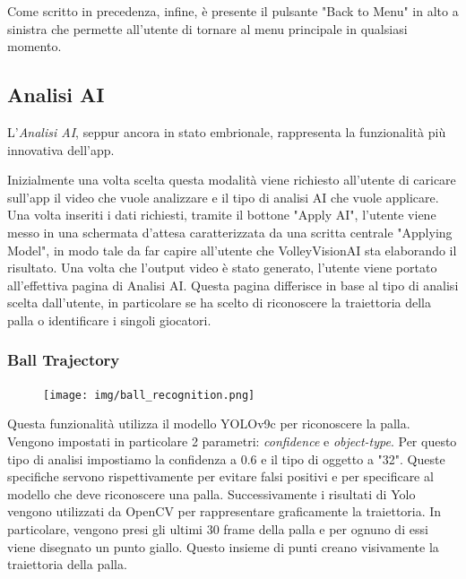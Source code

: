 \noindent Come scritto in precedenza, infine, è presente il pulsante "Back to Menu" in alto a sinistra che permette all'utente di tornare al menu principale in qualsiasi momento.
\pagebreak
\clearpage


\subsection{Analisi AI}
\label{subsec:funzionalita_ai}

L'\textit{Analisi AI}, seppur ancora in stato embrionale, rappresenta la funzionalità più innovativa dell'app. 

Inizialmente una volta scelta questa modalità viene richiesto all'utente di caricare sull'app il video che vuole analizzare e il tipo di analisi AI che vuole applicare.
Una volta inseriti i dati richiesti, tramite il bottone "Apply AI", l'utente viene messo in una schermata d'attesa caratterizzata da una scritta centrale  "Applying Model", in modo tale da far capire all'utente che VolleyVisionAI sta elaborando il risultato.
Una volta che l'output video è stato generato, l'utente viene portato all'effettiva pagina di Analisi AI.
Questa pagina differisce in base al tipo di analisi scelta dall'utente, in particolare se ha scelto di riconoscere la traiettoria della palla o identificare i singoli giocatori.

\subsubsection{Ball Trajectory}
\begin{figure}
    \centering
    \vspace{-0.4cm}
    \texttt{[image: img/ball\_recognition.png]}
    \label{fig:ball_trajectory}
\end{figure}

Questa funzionalità utilizza il modello YOLOv9c per riconoscere la palla. Vengono impostati in particolare 2 parametri: \textit{confidence} e \textit{object-type}. Per questo tipo di analisi impostiamo la confidenza a 0.6 e il tipo di oggetto a "32". Queste specifiche servono rispettivamente per evitare falsi positivi e per specificare al modello che deve riconoscere una palla. Successivamente i risultati di Yolo vengono utilizzati da OpenCV per rappresentare graficamente la traiettoria. In particolare, vengono presi gli ultimi 30 frame della palla e per ognuno di essi viene disegnato un punto giallo. Questo insieme di punti creano visivamente la traiettoria della palla.

